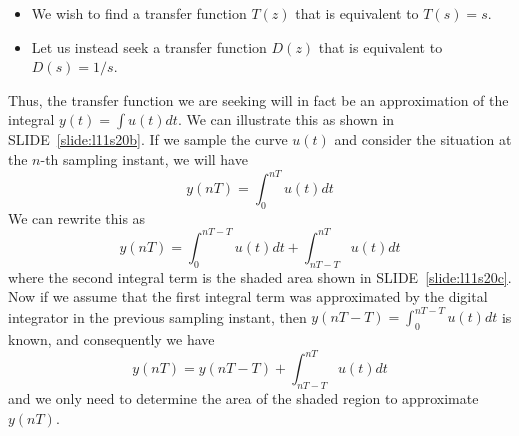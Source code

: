 \begin{slide}\label{slide:l11s20a}
  \begin{itemize}
  \item We wish to find a transfer function $T(z)$ that is equivalent to $T(s)=s$.
  \item Let us instead seek a transfer function $D(z)$ that is equivalent to $D(s) = 1/s$.
  \end{itemize}
\end{slide}

Thus, the transfer function we are seeking will in fact be an approximation of
the integral $y(t)=\int u(t) dt$. We can illustrate this as shown in SLIDE~\ref{slide:l11s20b}.
If we sample the curve $u(t)$ and consider the situation at the $n$-th sampling
instant, we will have $$y(nT) = \int_{0}^{nT} u(t) dt$$ We can rewrite this as
$$y(nT)= \int_{0}^{nT-T} u(t) dt + \int_{nT-T}^{nT} u(t) dt$$
where the second integral term is the shaded area shown in SLIDE~\ref{slide:l11s20c}.
Now if we assume that the first integral term was approximated by the digital
integrator in the previous sampling instant, then
$y(nT-T) = \int_{0}^{nT-T} u(t) dt$ is known, and consequently we have
$$y(nT) = y(nT-T) + \int_{nT-T}^{nT} u(t) dt$$
and we only need to determine the area of the shaded region to approximate $y(nT)$.

\begin{slide}\label{slide:l11s20b}
\begin{center}
\end{center}
\end{slide}

